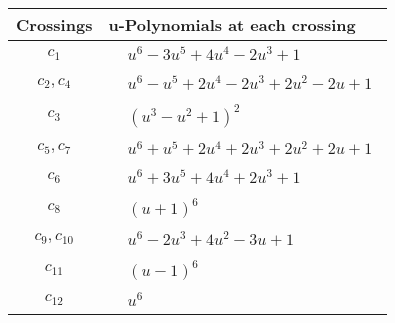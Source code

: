 \documentclass[1p]{elsarticle_modified}
\theoremstyle{definition}
\begin{document}
\begin{tabular}{m{50pt}|m{274pt}}
Crossings & \hspace{64pt}u-Polynomials at each crossing \\
\hline $$\begin{aligned}c_{1}\end{aligned}$$&$\begin{aligned}
&u^6-3 u^5+4 u^4-2 u^3+1
\end{aligned}$\\
\hline $$\begin{aligned}c_{2},c_{4}\end{aligned}$$&$\begin{aligned}
&u^6- u^5+2 u^4-2 u^3+2 u^2-2 u+1
\end{aligned}$\\
\hline $$\begin{aligned}c_{3}\end{aligned}$$&$\begin{aligned}
&(u^3- u^2+1)^2
\end{aligned}$\\
\hline $$\begin{aligned}c_{5},c_{7}\end{aligned}$$&$\begin{aligned}
&u^6+u^5+2 u^4+2 u^3+2 u^2+2 u+1
\end{aligned}$\\
\hline $$\begin{aligned}c_{6}\end{aligned}$$&$\begin{aligned}
&u^6+3 u^5+4 u^4+2 u^3+1
\end{aligned}$\\
\hline $$\begin{aligned}c_{8}\end{aligned}$$&$\begin{aligned}
&(u+1)^6
\end{aligned}$\\
\hline $$\begin{aligned}c_{9},c_{10}\end{aligned}$$&$\begin{aligned}
&u^6-2 u^3+4 u^2-3 u+1
\end{aligned}$\\
\hline $$\begin{aligned}c_{11}\end{aligned}$$&$\begin{aligned}
&(u-1)^6
\end{aligned}$\\
\hline $$\begin{aligned}c_{12}\end{aligned}$$&$\begin{aligned}
&u^6
\end{aligned}$\\
\hline
\end{tabular}\\~\\
\end{document}
